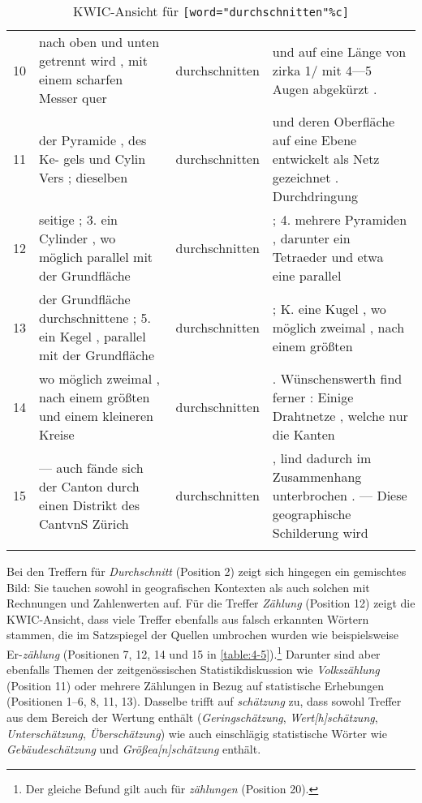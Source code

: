 {\begin{spacing}{1}
\begin{longtable}{p{0.1cm}p{5cm}cp{5cm}}
            10 & nach oben und unten getrennt wird , mit einem scharfen Messer quer & durchschnitten & 	
            und auf eine Länge von zirka 1/ mit 4—5 Augen abgekürzt .  \\ 
            11 & der Pyramide , des Ke- gels und Cylin Vers ; dieselben & durchschnitten & und deren Oberfläche auf eine Ebene entwickelt als Netz gezeichnet . Durchdringung  \\ 
            12 & seitige ; 3. ein Cylinder , wo möglich parallel mit der Grundfläche & durchschnitten & 	
            ; 4. mehrere Pyramiden , darunter ein Tetraeder und etwa eine parallel  \\ 
            13 & der Grundfläche durchschnittene ; 5. ein Kegel , parallel mit der Grundfläche & durchschnitten & 	
            ; K. eine Kugel , wo möglich zweimal , nach einem größten  \\ 
            14 & wo möglich zweimal , nach einem größten und einem kleineren Kreise & durchschnitten & . Wünschenswerth find ferner : Einige Drahtnetze , welche nur die Kanten  \\ 
            15 & — auch fände sich der Canton durch einen Distrikt des CantvnS Zürich & durchschnitten & , lind dadurch im Zusammenhang unterbrochen . — Diese geographische Schilderung wird  \\ 
            \bottomrule
        \caption{KWIC-Ansicht für \texttt{[word="durchschnitten"\%c]}}
        \label{table:4-4}
\end{longtable}
\end{spacing}}

Bei den Treffern für \textit{Durchschnitt} (Position 2) zeigt sich hingegen ein gemischtes Bild: Sie tauchen sowohl in geografischen Kontexten als auch solchen mit Rechnungen und Zahlenwerten auf. Für die Treffer \textit{Zählung} (Position 12) zeigt die KWIC-Ansicht, dass viele Treffer ebenfalls aus falsch erkannten Wörtern stammen, die im Satzspiegel der Quellen umbrochen wurden wie beispielsweise Er-\textit{zählung} (Positionen 7, 12, 14 und 15 in \cref{table:4-5}).\footnote{Der gleiche Befund gilt auch für \textit{zählungen} (Position 20).} Darunter sind aber ebenfalls Themen der zeitgenössischen Statistikdiskussion wie \textit{Volkszählung} (Position 11) oder mehrere Zählungen in Bezug auf statistische Erhebungen (Positionen 1–6, 8, 11, 13). Dasselbe trifft auf \textit{schätzung} zu, dass sowohl Treffer aus dem Bereich der Wertung enthält (\textit{Geringschätzung}, \textit{Wert[h]schätzung}, \textit{Unterschätzung}, \textit{Überschätzung}) wie auch einschlägig statistische Wörter wie \textit{Gebäudeschätzung} und \textit{Größea[n]schätzung} enthält.


